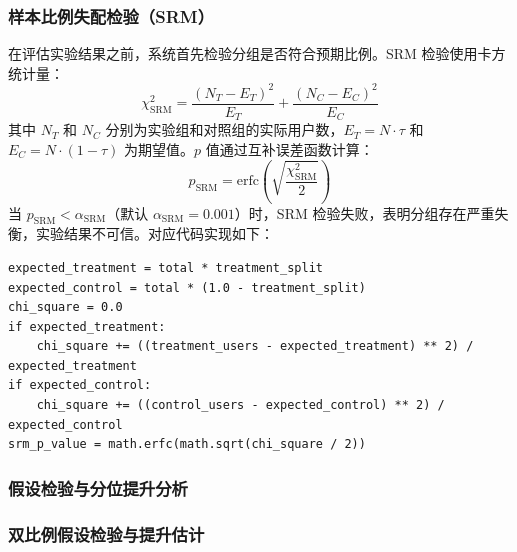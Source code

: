 \subsubsection{样本比例失配检验（SRM）}

在评估实验结果之前，系统首先检验分组是否符合预期比例。SRM 检验使用卡方统计量：
\begin{equation}
    \chi^2_{\text{SRM}} = \frac{(N_T - E_T)^2}{E_T} + \frac{(N_C - E_C)^2}{E_C}
    \label{eq:srm-chi-square}
\end{equation}
其中 $N_T$ 和 $N_C$ 分别为实验组和对照组的实际用户数，$E_T = N \cdot \tau$ 和 $E_C = N \cdot (1-\tau)$ 为期望值。$p$ 值通过互补误差函数计算：
\begin{equation}
    p_{\text{SRM}} = \text{erfc}\left(\sqrt{\frac{\chi^2_{\text{SRM}}}{2}}\right)
    \label{eq:srm-p-value}
\end{equation}
当 $p_{\text{SRM}} < \alpha_{\text{SRM}}$（默认 $\alpha_{\text{SRM}} = 0.001$）时，SRM 检验失败，表明分组存在严重失衡，实验结果不可信。对应代码实现如下：

\begin{lstlisting}[style=codexcode]
expected_treatment = total * treatment_split
expected_control = total * (1.0 - treatment_split)
chi_square = 0.0
if expected_treatment:
    chi_square += ((treatment_users - expected_treatment) ** 2) / expected_treatment
if expected_control:
    chi_square += ((control_users - expected_control) ** 2) / expected_control
srm_p_value = math.erfc(math.sqrt(chi_square / 2))
\end{lstlisting}

\subsubsection{假设检验与分位提升分析}

\subsubsection{双比例假设检验与提升估计}

